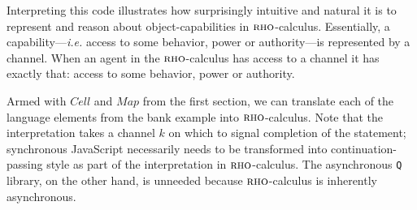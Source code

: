 \documentclass[]{acm_proc_article-sp}
\newcommand{\ldb}{[\![}
\newcommand{\rdb}{]\!]}
\newcommand{\id}[1]{\texttt{#1}}
\newcommand{\juxtap}{\mathbin{\id{|}}}
\newcommand{\binpar}[2]{#1 \juxtap #2}
\newcommand{\meaningof}[1]{\ldb #1 \rdb}
\newcommand{\defneqls}{\coloneqq}
\numberwithin{equation}{subsection}
\newcommand{\rhoc}{${\textsc{rho}}$-calculus}
\begin{document}
Interpreting this code illustrates how surprisingly intuitive and
natural it is to represent and reason about object-capabilities in
\rhoc. Essentially, a capability---{\em i.e.} access to some behavior, power
or authority---is represented by a channel. When an agent in the \rhoc\;
has access to a channel it has exactly that: access to some behavior,
power or authority.


Armed with $Cell$ and $Map$ from the first section, we can translate
each of the language elements from the bank example into \rhoc.  Note
that the interpretation takes a channel $k$ on which to signal 
completion of the statement; synchronous JavaScript necessarily needs 
to be transformed into continuation-passing style as part of the
interpretation in {\rhoc}.  The asynchronous {\tt Q} library, on the other
hand, is unneeded because {\rhoc} is inherently asynchronous.  
\end{document}
